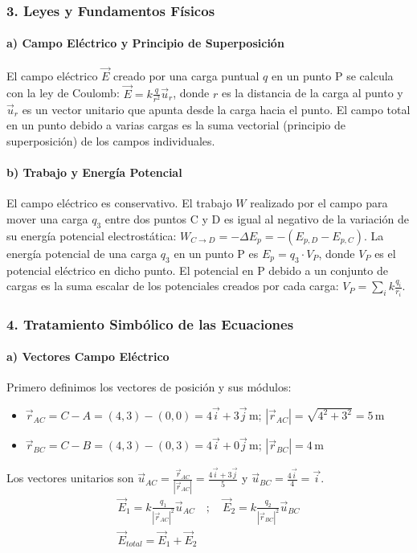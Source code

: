 \subsubsection*{3. Leyes y Fundamentos Físicos}
\paragraph*{a) Campo Eléctrico y Principio de Superposición}
El campo eléctrico $\vec{E}$ creado por una carga puntual $q$ en un punto P se calcula con la ley de Coulomb: $\vec{E} = k \frac{q}{r^2}\vec{u}_r$, donde $r$ es la distancia de la carga al punto y $\vec{u}_r$ es un vector unitario que apunta desde la carga hacia el punto. El campo total en un punto debido a varias cargas es la suma vectorial (principio de superposición) de los campos individuales.

\paragraph*{b) Trabajo y Energía Potencial}
El campo eléctrico es conservativo. El trabajo $W$ realizado por el campo para mover una carga $q_3$ entre dos puntos C y D es igual al negativo de la variación de su energía potencial electrostática: $W_{C \to D} = -\Delta E_p = -(E_{p,D} - E_{p,C})$. La energía potencial de una carga $q_3$ en un punto P es $E_p = q_3 \cdot V_P$, donde $V_P$ es el potencial eléctrico en dicho punto. El potencial en P debido a un conjunto de cargas es la suma escalar de los potenciales creados por cada carga: $V_P = \sum_i k \frac{q_i}{r_i}$.

\subsubsection*{4. Tratamiento Simbólico de las Ecuaciones}
\paragraph*{a) Vectores Campo Eléctrico}
Primero definimos los vectores de posición y sus módulos:
\begin{itemize}
    \item $\vec{r}_{AC} = C - A = (4,3) - (0,0) = 4\vec{i} + 3\vec{j} \, \text{m}$; \quad $|\vec{r}_{AC}| = \sqrt{4^2+3^2} = 5 \, \text{m}$
    \item $\vec{r}_{BC} = C - B = (4,3) - (0,3) = 4\vec{i} + 0\vec{j} \, \text{m}$; \quad $|\vec{r}_{BC}| = 4 \, \text{m}$
\end{itemize}
Los vectores unitarios son $\vec{u}_{AC} = \frac{\vec{r}_{AC}}{|\vec{r}_{AC}|} = \frac{4\vec{i} + 3\vec{j}}{5}$ y $\vec{u}_{BC} = \frac{4\vec{i}}{4} = \vec{i}$.
\begin{gather}
    \vec{E}_1 = k \frac{q_1}{|\vec{r}_{AC}|^2} \vec{u}_{AC} \quad ; \quad \vec{E}_2 = k \frac{q_2}{|\vec{r}_{BC}|^2} \vec{u}_{BC} \\
    \vec{E}_{total} = \vec{E}_1 + \vec{E}_2
\end{gather}
